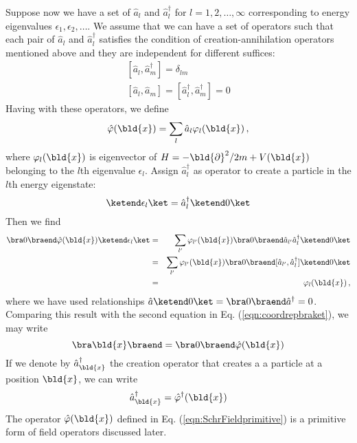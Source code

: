 \bigskip
Suppose now we have a set of $\hat{a}_l$  and $\hat{a}_l^\dagger$ for $l = 1, 2, \dots, \infty$
corresponding to energy eigenvalues $\epsilon_1, \epsilon_2,\dots$.
We assume that we can have a set of operators such that each pair of $\hat{a}_l$  and $\hat{a}_l^\dagger$
satisfies the condition of creation-annihilation operators mentioned above and they are independent
for different suffices:
\begin{equation}
\begin{array}{l}
[\hat{a}_l, \hat{a}^\dagger_m] = \delta_{lm}
\\
\left[ \hat{a}_l, \hat{a}_m \right] 
= [\hat{a}^\dagger_l, \hat{a}^\dagger_m] = 0
\end{array}
\label{eqn:Nbodycreanncomm}
\end{equation}
Having with these operators, we define
\begin{equation}
\hat{\varphi}(\bld{x}) = \sum_l \hat{a}_l \varphi_l (\bld{x})\,,
\label{eqn:SchrFieldprimitive}
\end{equation}
where $\varphi_l (\bld{x})$ is eigenvector of $H = -\bld{\partial}^2/2m + V(\bld{x})$ belonging
to the $l$th eigenvalue $\epsilon_l$.
Assign $\hat{a}_l^\dagger$ as operator to create a particle in the $l$th energy eigenstate:
\begin{equation}
\ketend \epsilon_l \ket = \hat{a}_l^\dagger \ketend 0 \ket
\end{equation}
Then we find
\begin{eqnarray}
\bra 0 \braend \hat{\varphi}(\bld{x}) \ketend \epsilon_l \ket
&=&
\sum_{l'} \varphi_{l'} (\bld{x}) 
\bra 0 \braend \hat{a}_{l'} \hat{a}_l^\dagger \ketend 0 \ket
\nonumber\\
&=&
\sum_{l'} \varphi_{l'} (\bld{x}) 
\bra 0 \braend [\hat{a}_{l'}, \hat{a}_l^\dagger] \ketend 0 \ket
\nonumber\\
&=&
\varphi_{l} (\bld{x}) \,,
\end{eqnarray}
where we have used relationships $\hat{a} \ketend 0 \ket = \bra 0 \braend \hat{a}^\dagger= 0$.
Comparing this result with the second equation in Eq. (\ref{eqn:coordrepbraket}), we may write
\begin{equation}
\bra \bld{x} \braend = \bra 0 \braend \hat{\varphi}(\bld{x})
\end{equation}
If we denote by $\hat{a}^\dagger_{\bld{x}}$ the creation operator 
that creates a a particle at a position $\bld{x}$, we can write
\begin{equation}
\hat{a}^\dagger_{\bld{x}} = \hat{\varphi}^\dagger(\bld{x})
\end{equation}
The operator $\hat{\varphi}(\bld{x})$ defined in Eq. (\ref{eqn:SchrFieldprimitive})
is a primitive form of field operators discussed later.
 
